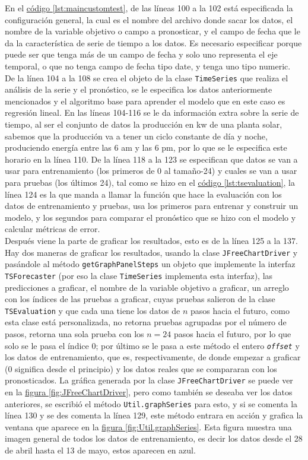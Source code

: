 En el \hyperref[lst:maincustomtest]{código \ref{lst:maincustomtest}}, de las líneas 100 a la 102 está especificada la configuración general, la cual es el nombre del archivo donde sacar los datos, el nombre de la variable objetivo o campo a pronosticar, y el campo de fecha que le da la característica de serie de tiempo a los datos. Es necesario especificar porque puede ser que tenga más de un campo de fecha y solo uno representa el eje temporal, o que no tenga campo de fecha tipo date, y tenga uno tipo numeric.\\
De la línea 104 a la 108 se crea el objeto de la clase \texttt{TimeSeries} que realiza el análisis de la serie y el pronóstico, se le especifica los datos anteriormente mencionados y el algoritmo base para aprender el modelo que en este caso es regresión lineal. En las líneas 104-116 se le da información extra sobre la serie de tiempo, al ser el conjunto de datos la producción en kw de una planta solar, sabemos que la producción va a tener un ciclo constante de día y noche, produciendo energía entre las 6 am y las 6 pm, por lo que se le especifica este horario en la línea 110.	De la línea 118 a la 123 se especifican que datos se van a usar para entrenamiento (los primeros de 0 al tamaño-24) y cuales se van a usar para pruebas (los últimos 24), tal como se hizo en el \hyperref[lst:tsevaluation]{código \ref{lst:tsevaluation}}, la línea 124 es la que manda a llamar la función que hace la evaluación con los datos de entrenamiento y pruebas, usa los primeros para entrenar y construir un modelo, y los segundos para comparar el pronóstico que se hizo con el modelo y calcular métricas de error.\\
Después viene la parte de graficar los resultados, esto es de la línea 125 a la 137. Hay dos maneras de graficar los resultados, usando la clase \texttt{JFreeChartDriver} y pasándole al método \texttt{getGraphPanelSteps} un  objeto que implemente la interfaz \texttt{TSForecaster} (por eso la clase \texttt{TimeSeries} implementa esta interfaz), las predicciones a graficar, el nombre de la variable objetivo a graficar, un arreglo con los índices de las pruebas a graficar, cuyas pruebas salieron de la clase \texttt{TSEvaluation} y que cada una tiene los datos de $n$ pasos hacia el futuro, como esta clase está personalizada, no retorna pruebas agrupadas por el número de pasos, retorna una sola prueba con los $n=24$ pasos hacia el futuro, por lo que solo se le pasa el índice 0; por último se le pasa a este método el entero \textit{\texttt{offset}} y los datos de entrenamiento, que es, respectivamente, de donde empezar a graficar (0 significa desde el principio) y los datos reales que se compararan con los pronosticados. La gráfica generada por la clase \texttt{JFreeChartDriver} se puede ver en la 
\hyperref[fig:JFreeChartDriver]{figura \ref{fig:JFreeChartDriver}}, 
pero como también se deseaba ver los datos anteriores, se escribió el método \texttt{Util.graphSeries} para esto, y si se comenta la línea 130 y se des comenta la línea 129, este método entrara en acción y grafica la ventana que aparece en la \hyperref[fig:Util.graphSeries]{figura \ref{fig:Util.graphSeries}}. Esta figura muestra una imagen general de todos los datos de entrenamiento, es decir los datos desde el 28 de abril hasta el 13 de mayo, estos aparecen en azul.

